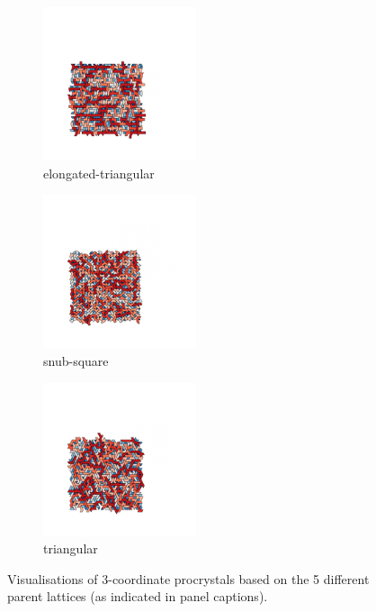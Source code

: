\begin{figure}[bt]
     \vspace{2mm}
     \begin{subfigure}[b]{0.45\textwidth}
         \centering
         \includegraphics[height=4.5cm]{./figures/procrystals/pro_elong3.pdf}
         \caption{elongated\--triangular}
         \label{fig:pro3c}
     \end{subfigure}
     \begin{subfigure}[b]{0.45\textwidth}
         \centering
         \includegraphics[height=4.5cm]{./figures/procrystals/pro_snub3.pdf}
         \caption{snub\--square}
         \label{fig:pro3d}
     \end{subfigure}
     \hfill
     
     \vspace{2mm}     
     \begin{subfigure}[b]{0.45\textwidth}
         \centering
         \includegraphics[height=4.5cm]{./figures/procrystals/pro_tri3.pdf}
         \caption{triangular}
         \label{fig:pro3e}
     \end{subfigure}
     \hfill
    
     \caption{Visualisations of 3\--coordinate procrystals based on the 5 different parent lattices (as indicated in panel captions).}
     \label{fig:pro3}
\end{figure}

